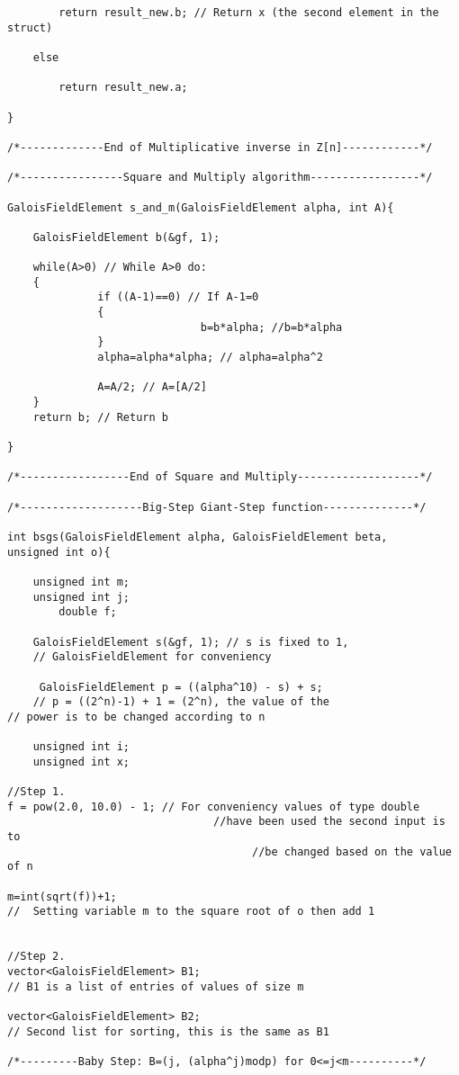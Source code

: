 \documentclass[iwp,first]{luthesis}
\begin{document}
\begin{verbatim}
		return result_new.b; // Return x (the second element in the struct)

	else

		return result_new.a;

}   

/*-------------End of Multiplicative inverse in Z[n]------------*/

/*----------------Square and Multiply algorithm-----------------*/

GaloisFieldElement s_and_m(GaloisFieldElement alpha, int A){
    
    GaloisFieldElement b(&gf, 1);

    while(A>0) // While A>0 do:
    {
              if ((A-1)==0) // If A-1=0
              {
                              b=b*alpha; //b=b*alpha                
              }
              alpha=alpha*alpha; // alpha=alpha^2
           
              A=A/2; // A=[A/2]
    }
    return b; // Return b
    
}

/*-----------------End of Square and Multiply-------------------*/ 

/*-------------------Big-Step Giant-Step function--------------*/

int bsgs(GaloisFieldElement alpha, GaloisFieldElement beta, 
unsigned int o){ 

    unsigned int m;
    unsigned int j;
	    double f;

	GaloisFieldElement s(&gf, 1); // s is fixed to 1, 
 	// GaloisFieldElement for conveniency
   
	 GaloisFieldElement p = ((alpha^10) - s) + s; 
	// p = ((2^n)-1) + 1 = (2^n), the value of the
// power is to be changed according to n

    unsigned int i;
    unsigned int x;
    
//Step 1.
f = pow(2.0, 10.0) - 1; // For conveniency values of type double 
		                        //have been used the second input is to 
 				                      //be changed based on the value of n

m=int(sqrt(f))+1; 
//  Setting variable m to the square root of o then add 1


//Step 2.
vector<GaloisFieldElement> B1; 
// B1 is a list of entries of values of size m

vector<GaloisFieldElement> B2; 
// Second list for sorting, this is the same as B1

/*---------Baby Step: B=(j, (alpha^j)modp) for 0<=j<m----------*/


\end{verbatim}
\end{document}
